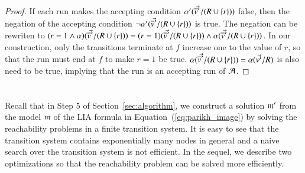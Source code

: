 {\begin{proof}
 If each run makes the accepting condition $\alpha'(\vec{\overline{v}'}/(R\cup\{r\}))$ false, then the negation of the accepting condition $\neg\alpha'(\vec{\overline{v}'}/(R\cup\{r\}))$ is true. The negation can be rewriten to $(r=1\wedge \alpha)(\vec{\overline{v}'}/(R\cup\{r\})) = (r=1)(\vec{\overline{v}'}/(R\cup\{r\}))\wedge \alpha(\vec{\overline{v}'}/(R\cup\{r\}))$. In our construction, only the transitions terminate at $f$ increase one to the value of $r$, so that the run must end at $f$ to make $r=1$ be true. $\alpha(\vec{\overline{v}'}/(R\cup\{r\})) = \alpha(\vec{v'}/R)$ is also need to be true, implying that the run is an accepting run of $\mathcal{A}$.
\end{proof}
}

\section{}\label{sec-opt-sol-gen}



Recall that in Step 5 of Section~\ref{sec:algorithm}, we construct a solution $\mathfrak{m}'$ from the model $\mathfrak{m}$ of the LIA formula in Equation~(\ref{eq:parikh_image}) by solving the reachability problems in a finite transition system. It is easy to see that the transition system contains exponentially many nodes in general and a naive search over the transition system is not efficient. In the sequel, we describe two optimizations so that the reachability problem can be solved more efficiently. 



